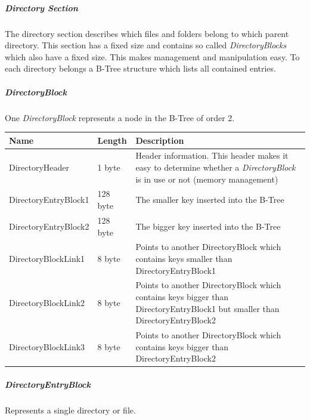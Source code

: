 \subparagraph{Directory Section}
The directory section describes which files and folders belong to which parent
directory. This section has a fixed size and contains so called
\textit{DirectoryBlocks} which also have a fixed size. This makes management and
manipulation easy. To each directory belongs a B-Tree structure which lists all
contained entries.


\subparagraph*{DirectoryBlock}

One \textit{DirectoryBlock} represents a node in the B-Tree of order 2.

\begin{tabular}{|l|l|p{5cm}|}
\hline
\textbf{Name} & \textbf{Length} & \textbf{Description}
\\  \hline

DirectoryHeader & 1 byte & Header information. This header makes it easy to
determine whether a \textit{DirectoryBlock} is in use or not (memory
management)

\\  \hline

DirectoryEntryBlock1 & 128 byte & The smaller key inserted into the
B-Tree

\\  \hline

DirectoryEntryBlock2 & 128 byte & The bigger key inserted into the B-Tree

\\  \hline

DirectoryBlockLink1 & 8 byte & Points to another DirectoryBlock which contains
keys smaller than DirectoryEntryBlock1

\\  \hline

DirectoryBlockLink2 & 8 byte & Points to another DirectoryBlock which contains
keys bigger than DirectoryEntryBlock1 but smaller than DirectoryEntryBlock2

\\  \hline

DirectoryBlockLink3 & 8 byte & Points to another DirectoryBlock which contains
keys bigger than DirectoryEntryBlock2

\\  \hline


\end{tabular}

\subparagraph*{DirectoryEntryBlock}

Represents a single directory or file.

